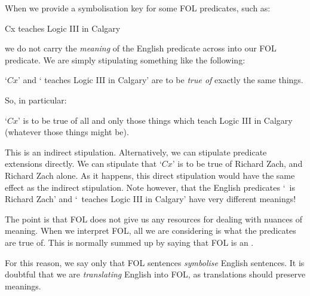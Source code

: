 When we provide a symbolisation key for some FOL predicates, such as:
	\begin{ekey}
		\item[Cx]  teaches Logic III in Calgary
	\end{ekey} 
we do not carry the \emph{meaning} of the English predicate across into our FOL predicate. We are simply stipulating something like the following:
	\begin{ebullet}
		\item `$Cx$' and ` teaches Logic III in Calgary' are to be \emph{true of} exactly the same things. 
	\end{ebullet}
So, in particular:
	\begin{ebullet}
		\item `$Cx$' is to be true of all and only those things which teach Logic III in Calgary (whatever those things might be).
	\end{ebullet}
This is an indirect stipulation. Alternatively, we can stipulate predicate extensions directly. We can stipulate that `$Cx$' is to be true of Richard Zach, and Richard Zach alone. As it happens, this direct stipulation would have the same effect as the indirect stipulation. Note however, that the English predicates `\blank\ is Richard Zach' and `\blank\ teaches Logic III in Calgary' have very different meanings!

The point is that FOL does not give us any resources for dealing with nuances of meaning. When we interpret FOL, all we are considering is what the predicates are true of. This is normally summed up by saying that FOL is an . 

For this reason, we say only that FOL sentences \emph{symbolise} English sentences. It is doubtful that we are \emph{translating} English into FOL, as translations should preserve meanings.

